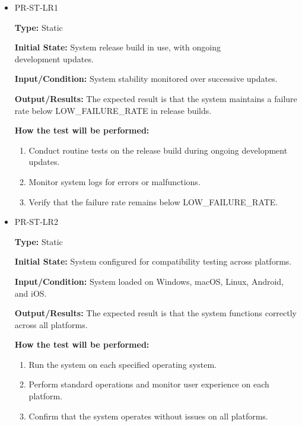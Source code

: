 \documentclass[12pt, titlepage]{article}
\begin{document}
\begin{itemize}
  \item PR-ST-LR1
  \begin{mdframed}[linewidth=0.5mm]
      \textbf{Type:} Static \par
      \textbf{Initial State:} System release build in use, with ongoing \\development updates. \par
      \textbf{Input/Condition:} System stability monitored over successive updates. \par
      \textbf{Output/Results:} The expected result is that the system maintains a failure rate below LOW\_FAILURE\_RATE in release builds. \par
      \textbf{How the test will be performed:}
      \begin{enumerate}[noitemsep]
        \item Conduct routine tests on the release build during ongoing development \\ updates.
        \item Monitor system logs for errors or malfunctions.
        \item Verify that the failure rate remains below LOW\_FAILURE\_RATE.
      \end{enumerate}
  \end{mdframed}
  \item PR-ST-LR2
  \begin{mdframed}[linewidth=0.5mm]
      \textbf{Type:} Static \par
      \textbf{Initial State:} System configured for compatibility testing across platforms. \par
      \textbf{Input/Condition:} System loaded on Windows, macOS, Linux, Android, and iOS. \par
      \textbf{Output/Results:} The expected result is that the system functions correctly across all platforms. \par
      \textbf{How the test will be performed:}
      \begin{enumerate}[noitemsep]
        \item Run the system on each specified operating system.
        \item Perform standard operations and monitor user experience on each platform.
        \item Confirm that the system operates without issues on all platforms.
      \end{enumerate}
  \end{mdframed}
\end{itemize}
\end{document}

